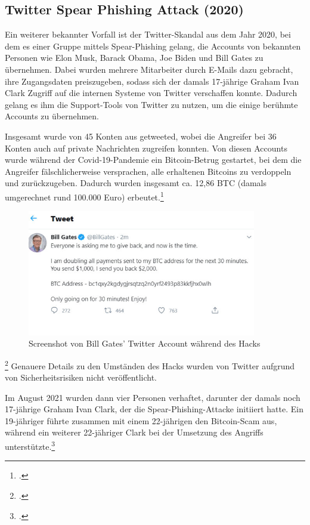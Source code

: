 \documentclass[12pt, a4paper, oneside]{scrartcl}
\begin{document}
\subsection{Twitter Spear Phishing Attack (2020)}

Ein weiterer bekannter Vorfall ist der Twitter-Skandal aus dem Jahr 2020, bei dem es einer Gruppe mittels Spear-Phishing gelang,
die Accounts von bekannten Personen wie Elon Musk, Barack Obama, Joe Biden und Bill Gates zu übernehmen.
Dabei wurden mehrere Mitarbeiter durch E-Mails dazu gebracht, ihre Zugangsdaten preiszugeben, sodass sich 
der damals 17-jährige Graham Ivan Clark Zugriff auf die internen Systeme von Twitter verschaffen konnte. Dadurch gelang
es ihm die Support-Tools von Twitter zu nutzen, um die einige berühmte Accounts zu übernehmen. 
\par
Insgesamt wurde von 45 Konten aus getweeted, wobei die Angreifer bei 36 Konten auch auf private Nachrichten zugreifen konnten. 
Von diesen Accounts wurde während der Covid-19-Pandemie ein Bitcoin-Betrug gestartet, bei dem die Angreifer fälschlicherweise versprachen, 
alle erhaltenen Bitcoins zu verdoppeln und zurückzugeben. Dadurch wurden insgesamt ca. 12,86 BTC 
(damals umgerechnet rund 100.000 Euro) erbeutet.\footcite{teampw_TwitterPhishing}

\begin{figure}[h!]
  \centering
  \includegraphics[width=10cm]{bill_hack.png}
  \caption[Screenshot von Bill Gates' Twitter Account während des Hacks]{Screenshot von Bill Gates' Twitter Account während des Hacks\footnotemark}
\end{figure}
\footcitetext{PicTwitterHack}
Genauere Details zu den Umständen des Hacks wurden von Twitter aufgrund von Sicherheitsrisiken nicht veröffentlicht. 
\par
Im August 2021 wurden dann vier Personen verhaftet, darunter der damals noch 17-jährige Graham Ivan Clark, 
der die Spear-Phishing-Attacke initiiert hatte. Ein 19-jähriger führte zusammen mit einem 22-jährigen den 
Bitcoin-Scam aus, während ein weiterer 22-jähriger Clark bei der Umsetzung des Angriffs unterstützte.\footcite{teampw_TwitterPhishing}\\
\end{document}
